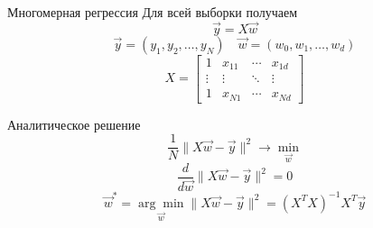 \documentclass[aspectratio=169, professionalfonts]{beamer}
\begin{document}
\begin{frame}{Многомерная регрессия}
    Для всей выборки получаем
    {\Large
        \[ \vec{y} = X \vec{w} \]
        \[ \vec{y} = (y_1, y_2, \dots, y_N) \quad \vec{w} = (w_0, w_1, \dots, w_d) \]
        \[
            X = \begin{bmatrix}
                1 & x_{11} & \cdots & x_{1d} \\
                \vdots & \vdots & \ddots & \vdots \\
                1 & x_{N1} & \cdots & x_{Nd}
            \end{bmatrix}
        \]
    }
\end{frame}

\begin{frame}{Аналитическое решение}
    \LARGE
    \[ \frac{1}{N} \| X \vec{w} - \vec{y} \|^2 \rightarrow \min_{\vec{w}} \]
    \pause
    \[ \frac{d}{d \vec{w}} \| X \vec{w} - \vec{y} \|^2 = 0 \]
    \pause
    \[
        \vec{w}^* = \underset{\vec{w}}{\arg\min} \| X \vec{w} - \vec{y} \|^2
        = {(X^T X)}^{-1} X^T \vec{y}
    \]
\end{frame}
\end{document}
